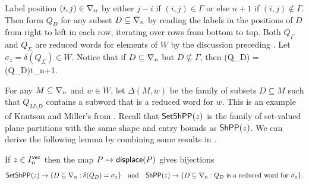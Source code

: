 \documentclass[10pt]{article}
\begin{document}
Label position $(i,j) \in\nabla_n$ by either $j - i$
if $(i,j) \in \Gamma$ or else $n+1$ if $(i,j)\notin \Gamma$.
Then form
$Q_D$ for any subset $D\subseteq \nabla_n $ by 
reading the labels in the positions of $D$ from right to left in each row, iterating over rows from bottom to top. 
Both $Q_{\Gamma}$ and $Q_{\Sigma}$ are reduced words for elements of $W$ by the discussion preceding \cite[Prop.~5.13]{GrahamKreimanB}.
Let $\sigma_z = \delta(Q_{\Sigma}) \in W $.
Notice that if $D\subseteq \nabla_n$ but $D\not\subseteq \Gamma$, then 
\be\label{n2-case} \delta(Q_D) = \delta(Q_{D\cap \Gamma})t_{n+1}.
\ee


For any  $M \subseteq \nabla_n$ and  $w \in W$, let  
$\Delta( M, w)$ be the family of subsets $D\subseteq M$ such that  $Q_{M\setminus D}$ contains a subword that is a reduced word for $w$. 
This is an example of Knutson and Miller's 
from \cite{KnutsonMillerSubword}.
Recall that $\mathsf{SetShPP}(z)$ is the family of set-valued plane partitions with the same shape and entry bounds as $\mathsf{ShPP}(z)$.
We can derive the following lemma by combining 
some results in \cite{GrahamKreimanB}.



\begin{lemma}
\label{gra-kre-lem}
If $z \in I^{\mathsf{vex}}_n$ then the map $P \mapsto \mathsf{displace}(P)$ gives  bijections 
\[ \mathsf{SetShPP}(z) \to \{ D\subseteq \nabla_n : \delta(Q_D) = \sigma_z\}
\quad\text{and}\quad \mathsf{ShPP}(z) \to \{ D \subseteq \nabla_n : Q_D\text{ is a reduced word for }\sigma_z\}.\]
\end{lemma}
\end{document}

